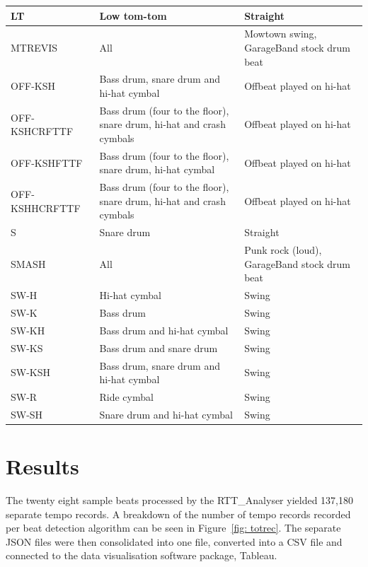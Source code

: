 \documentclass[a4paper, 11pt]{article}
\begin{document}
\begin{table}[htbp]
\begin{tabular}{|p{3cm}|p{4cm}|l|}
\hline 
LT & Low tom-tom & Straight\\
\hline 
MTREVIS & All & Mowtown swing, GarageBand stock drum beat\\
\hline 
OFF-KSH & Bass drum, snare drum and hi-hat cymbal & Offbeat played on hi-hat\\
\hline 
OFF-KSHCRFTTF & Bass drum (four to the floor), snare drum, hi-hat and crash cymbals & Offbeat played on hi-hat\\
\hline 
OFF-KSHFTTF & Bass drum (four to the floor), snare drum, hi-hat cymbal & Offbeat played on hi-hat\\
\hline 
OFF-KSHHCRFTTF & Bass drum (four to the floor), snare drum, hi-hat and crash cymbals & Offbeat played on hi-hat\\
\hline 
S & Snare drum & Straight\\
\hline 
SMASH & All & Punk rock (loud), GarageBand stock drum beat\\
\hline 
SW-H & Hi-hat cymbal & Swing\\
\hline 
SW-K & Bass drum & Swing\\
\hline 
SW-KH & Bass drum and hi-hat cymbal & Swing\\
\hline 
SW-KS & Bass drum and snare drum & Swing\\
\hline 
SW-KSH & Bass drum, snare drum and hi-hat cymbal & Swing\\
\hline 
SW-R & Ride cymbal & Swing\\
\hline 
SW-SH & Snare drum and hi-hat cymbal & Swing\\
\hline
\end{tabular}
\label{tab: beats}
\end{table}
\clearpage
\maketitle \section{Results}
The twenty eight sample beats processed by the RTT\_Analyser yielded 137,180 separate tempo records. A breakdown of the number of tempo records recorded per beat detection algorithm can be seen in Figure~\ref{fig: totrec}. The separate JSON files were then consolidated into one file, converted into a CSV file and connected to the data visualisation software package, Tableau\cite{tableau}.
\end{document}
